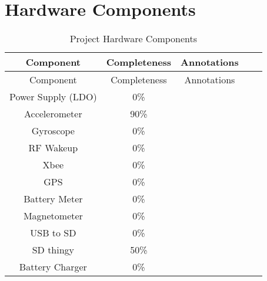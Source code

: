 \section{Hardware Components}
    \begin{center}
    \begin{longtable}{|c|c|c|c|c|}
        \caption{Project Hardware Components \label{tab:hwComp}} \\
        \hline
        \rowcolor{Gray}
        Component & Completeness & Annotations \\
        \hline \hline \endfirsthead
        \hline
        \rowcolor{Gray}
        Component & Completeness & Annotations \\
        \hline \hline \endhead
        \endfoot
        Power Supply (LDO) & 0\%   &  \\ \hline
        Accelerometer & 90\%  &  \\ \hline
        Gyroscope & 0\%   &  \\ \hline
        RF Wakeup & 0\%   &  \\ \hline
        Xbee  & 0\%   &  \\ \hline
        GPS   & 0\%   &  \\ \hline
        Battery Meter & 0\%   &  \\ \hline
        Magnetometer & 0\%   &  \\ \hline
        USB to SD & 0\%   &  \\ \hline
        SD thingy & 50\%  &  \\ \hline
        Battery Charger & 0\%   &  \\ \hline
    \end{longtable}
    \end{center}

